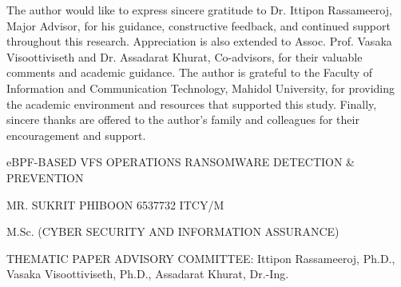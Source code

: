 The author would like to express sincere gratitude to Dr. Ittipon Rassameeroj, Major Advisor, for his guidance, constructive feedback, and continued support throughout this research. Appreciation is also extended to Assoc. Prof. Vasaka Visoottiviseth and Dr. Assadarat Khurat, Co-advisors, for their valuable comments and academic guidance. The author is grateful to the Faculty of Information and Communication Technology, Mahidol University, for providing the academic environment and resources that supported this study. Finally, sincere thanks are offered to the author's family and colleagues for their encouragement and support.

eBPF-BASED VFS OPERATIONS RANSOMWARE DETECTION \& PREVENTION

MR. SUKRIT PHIBOON   6537732 ITCY/\allowbreak{}M

M.Sc. (CYBER SECURITY AND INFORMATION ASSURANCE)

THEMATIC PAPER ADVISORY COMMITTEE: Ittipon Rassameeroj, Ph.D., Vasaka Visoottiviseth, Ph.D., Assadarat Khurat, Dr.-Ing.
